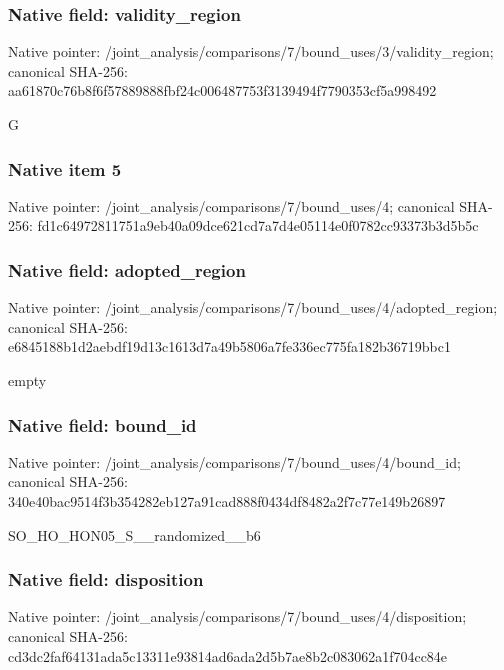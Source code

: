 \documentclass[10pt,a4paper]{article}
\begin{document}
\subsubsection{Native field: validity\_\allowbreak{}region}
Native pointer: /joint\_\allowbreak{}analysis/comparisons/7/bound\_\allowbreak{}uses/3/validity\_\allowbreak{}region; canonical SHA-256: aa61870c76b8f6f57889888fbf24c006487753f3139494f7790353cf5a998492

\begingroup\raggedright\sloppy G\par\endgroup

\subsubsection{Native item 5}
Native pointer: /joint\_\allowbreak{}analysis/comparisons/7/bound\_\allowbreak{}uses/4; canonical SHA-256: fd1c64972811751a9eb40a09dce621cd7a7d4e05114e0f0782cc93373b3d5b5c

\subsubsection{Native field: adopted\_\allowbreak{}region}
Native pointer: /joint\_\allowbreak{}analysis/comparisons/7/bound\_\allowbreak{}uses/4/adopted\_\allowbreak{}region; canonical SHA-256: e6845188b1d2aebdf19d13c1613d7a49b5806a7fe336ec775fa182b36719bbc1

\begingroup\raggedright\sloppy empty\par\endgroup

\subsubsection{Native field: bound\_\allowbreak{}id}
Native pointer: /joint\_\allowbreak{}analysis/comparisons/7/bound\_\allowbreak{}uses/4/bound\_\allowbreak{}id; canonical SHA-256: 340e40bac9514f3b354282eb127a91cad888f0434df8482a2f7c77e149b26897

\begingroup\raggedright\sloppy SO\_\allowbreak{}HO\_\allowbreak{}HON05\_\allowbreak{}S\_\allowbreak{}\_\allowbreak{}randomized\_\allowbreak{}\_\allowbreak{}b6\par\endgroup

\subsubsection{Native field: disposition}
Native pointer: /joint\_\allowbreak{}analysis/comparisons/7/bound\_\allowbreak{}uses/4/disposition; canonical SHA-256: cd3dc2faf64131ada5c13311e93814ad6ada2d5b7ae8b2c083062a1f704cc84e
\end{document}
